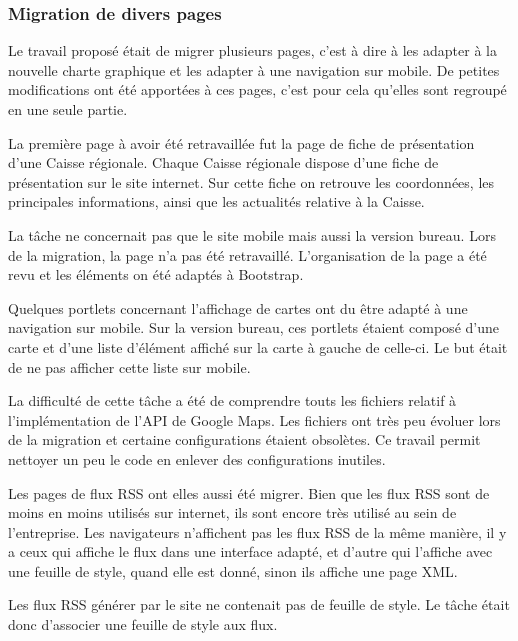 \documentclass[12pt,a4paper]{article}
\begin{document}
\subsubsection{Migration de divers pages}
Le travail proposé était de migrer plusieurs pages, c'est à dire à les adapter à la nouvelle charte graphique et les adapter à une navigation sur mobile. De petites modifications ont été apportées à ces pages, c'est pour cela qu'elles sont regroupé en une seule partie.\par 
\bigskip
La première page à avoir été retravaillée fut la page de fiche de présentation d'une Caisse régionale. Chaque Caisse régionale dispose d'une fiche de présentation sur le site internet. Sur cette fiche on retrouve les coordonnées, les principales informations, ainsi que les actualités relative à la Caisse.\par 
La tâche ne concernait pas que le site mobile mais aussi la version bureau. Lors de la migration, la page n'a pas été retravaillé. L'organisation de la page a été revu et les éléments on été adaptés à Bootstrap.\par 
\bigskip
Quelques portlets concernant l'affichage de cartes ont du être adapté à une navigation sur mobile. Sur la version bureau, ces portlets étaient composé d'une carte et d'une liste d'élément affiché sur la carte à gauche de celle-ci. Le but était de ne pas afficher cette liste sur mobile.\par 
La difficulté de cette tâche a été de comprendre touts les fichiers relatif à l'implémentation de l'API de Google Maps. Les fichiers ont très peu évoluer lors de la migration et certaine configurations étaient obsolètes. Ce travail permit nettoyer un peu le code en enlever des configurations inutiles.\par
\bigskip
Les pages de flux RSS ont elles aussi été migrer. Bien que les flux RSS sont de moins en moins utilisés sur internet, ils sont encore très utilisé au sein de l'entreprise. Les navigateurs n'affichent pas les flux RSS de la même manière, il y a ceux qui affiche le flux dans une interface adapté, et d'autre qui l'affiche avec une feuille de style, quand elle est donné, sinon ils affiche une page XML.\par 
Les flux RSS générer par le site ne contenait pas de feuille de style. Le tâche était donc d'associer une feuille de style aux flux.\par

\newpage
\end{document}
